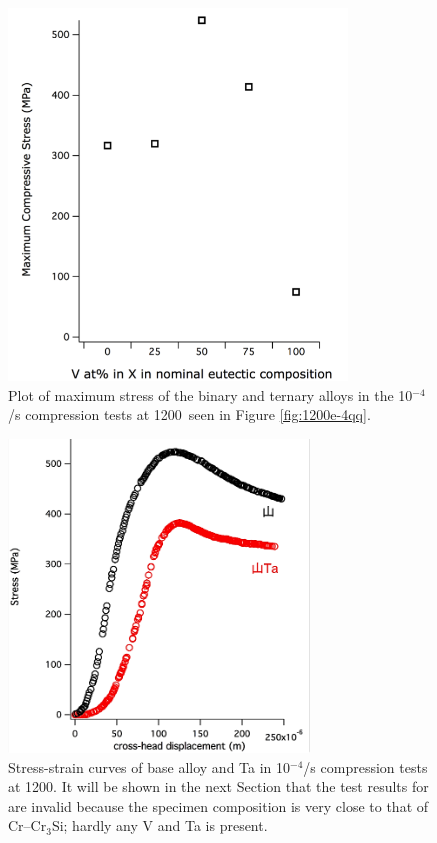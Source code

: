 %
%
\begin{figure}[H]
\begin{center}
\includegraphics[width=9cm]{binaryternary1200e-4}
\caption{Plot of maximum stress of the binary and ternary alloys in the 10$^{-4}$/s compression tests at 1200\celsius\ seen in Figure \ref{fig:1200e-4qq}.}
\label{fig:binaryternary1200e-4}
\end{center}
\end{figure}
%
%
\begin{figure}[H]
\begin{center}
\includegraphics[width=8cm]{sansanTa1200e-4}
\caption{Stress-strain curves of base alloy  and Ta in 10$^{-4}$/s compression tests at 1200\celsius.  It will be shown in the next Section that the test results for  are invalid because the specimen composition is very close to that of Cr--Cr$_3$Si; hardly any V and Ta is present.}
\label{fig:sansanTa1200e-4}
\end{center}
\end{figure}
